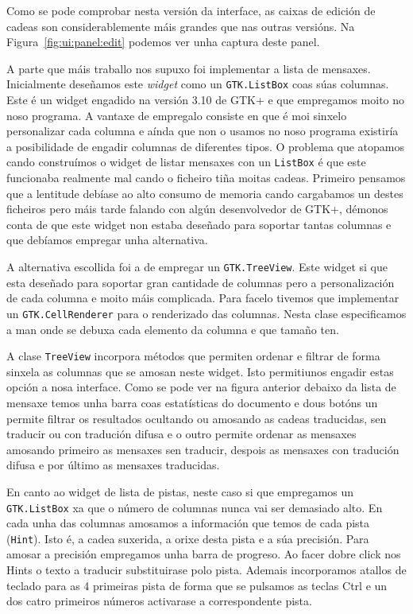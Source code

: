 Como se pode comprobar nesta versión da interface, as caixas de edición de cadeas son considerablemente máis grandes que nas outras versións. Na Figura~\ref{fig:ui:panel:edit} podemos ver unha captura deste panel.

A parte que máis traballo nos supuxo foi implementar a lista de mensaxes. Inicialmente deseñamos este \emph{widget} como un \lstinline{GTK.ListBox} coas súas columnas. Este é un widget engadido na versión 3.10 de GTK+ e que empregamos moito no noso programa. A vantaxe de empregalo consiste en que é moi sinxelo personalizar cada columna e aínda que non o usamos no noso programa existiría a posibilidade de engadir columnas de diferentes tipos. O problema que atopamos cando construímos o widget de listar mensaxes con un \lstinline{ListBox} é que este funcionaba realmente mal cando o ficheiro tiña moitas cadeas. Primeiro pensamos que a lentitude debíase ao alto consumo de memoria cando cargabamos un destes ficheiros pero máis tarde falando con algún desenvolvedor de GTK+, démonos conta de que este widget non estaba deseñado para soportar tantas columnas e que debíamos empregar unha alternativa.

A alternativa escollida foi a de empregar un \lstinline{GTK.TreeView}. Este widget si que esta deseñado para soportar gran cantidade de columnas pero a personalización de cada columna e moito máis complicada. Para facelo tivemos que implementar un \lstinline{GTK.CellRenderer} para o renderizado das columnas. Nesta clase especificamos a man onde se debuxa cada elemento da columna e que tamaño ten.

A clase \lstinline{TreeView} incorpora métodos que permiten ordenar e filtrar de forma sinxela as columnas que se amosan neste widget. Isto permitiunos engadir estas opción a nosa interface. Como se pode ver na figura anterior debaixo da lista de mensaxe temos unha barra coas estatísticas do documento e dous botóns un permite filtrar os resultados ocultando ou amosando as cadeas traducidas, sen traducir ou con tradución difusa e o outro permite ordenar as mensaxes amosando primeiro as mensaxes sen traducir, despois as mensaxes con tradución difusa e por último as mensaxes traducidas.

En canto ao widget de lista de pistas, neste caso si que empregamos un \lstinline{GTK.ListBox} xa que o número de columnas nunca vai ser demasiado alto. En cada unha das columnas amosamos a información que temos de cada pista (\lstinline{Hint}). Isto é, a cadea suxerida, a orixe desta pista e a súa precisión. Para amosar a precisión empregamos unha barra de progreso. Ao facer dobre click nos Hints o texto a traducir substituirase polo pista. Ademais incorporamos atallos de teclado para as 4 primeiras pista de forma que se pulsamos as teclas Ctrl e un dos catro primeiros números activarase a correspondente pista.

